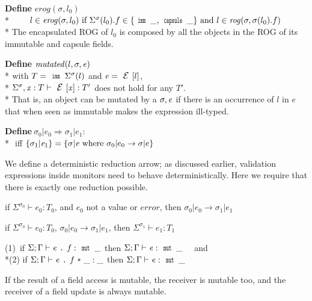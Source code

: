 \noindent\textbf{Define} $\mathit{erog}(\sigma,l_0)$\\*
${}_{}\quad\quad
l \in \mathit{erog}(\sigma,l_0)
\text{ if } \Sigma^\sigma(l_0).f \in \{\Kw{imm}\,\_,\Kw{capsule}\,\_\}
\text{ and } l \in \mathit{rog}(\sigma,\sigma(l_0).f)
$\\*
\noindent
The encapsulated ROG of $l_0$ is composed by all the objects
in the ROG of its immutable and capsule fields.


\noindent\textbf{Define} $\mathit{mutated}(l,\sigma,\e)$\\*
${}_{}$\quad\quad with $T=\Kw{imm}\,\Sigma^\sigma(l)$ and $\e=\ctx[l]$,\\*
${}_{}$\quad\quad $\Sigma^\sigma,\x:T\vdash\ctx[\x]:T'$ does not hold for any $T'$.\\*
\noindent That is, an object can be mutated by a $\sigma,\e$ if there is an occurrence of 
$l$ in $e$ that when seen as immutable makes the expression ill-typed.



\noindent\textbf{Define}$\ \sigma_0|e_0\Rightarrow \sigma_1|e_1$:\\*
${}_{}$\quad\quad
iff $\{\sigma_1|\e_1\}=\{\sigma|\e \text{ where } \sigma_0|e_0\rightarrow \sigma|e\}$

\noindent We define
a deterministic reduction arrow;
as discussed earlier, validation expressions inside monitors need to behave deterministically.
Here we require that there is exactly one reduction possible.



\begin{Assumption}[Progress]
if $\Sigma^{\sigma_0}\vdash e_0: T_0$,
and $e_0$ not a value or $\mathit{error}$, then
$\sigma_0|e_0\rightarrow \sigma_1|e_1$
\end{Assumption}


\begin{Assumption}[SubjectReductionBase]
if $\Sigma^{\sigma_0}\vdash e_0: T_0$,
$\sigma_0|e_0\rightarrow \sigma_1|e_1$,
then
$\Sigma^{\sigma_1}\vdash e_1: T_1$
\end{Assumption}


\begin{Assumption}[MutField]
(1)\ if $\Sigma;\Gamma\vdash\e\singleDot\f:\Kw{mut}\,\_$
then $\Sigma;\Gamma\vdash\e:\Kw{mut}\,\_$
\ \ and \\*(2)
if $\Sigma;\Gamma\vdash\e\singleDot\f\Kw{=}\_:\_$
then $\Sigma;\Gamma\vdash\e:\Kw{mut}\,\_$
\end{Assumption}
\noindent If the result of a field access is mutable,
the receiver is mutable too, and the receiver of a field update is always mutable.

